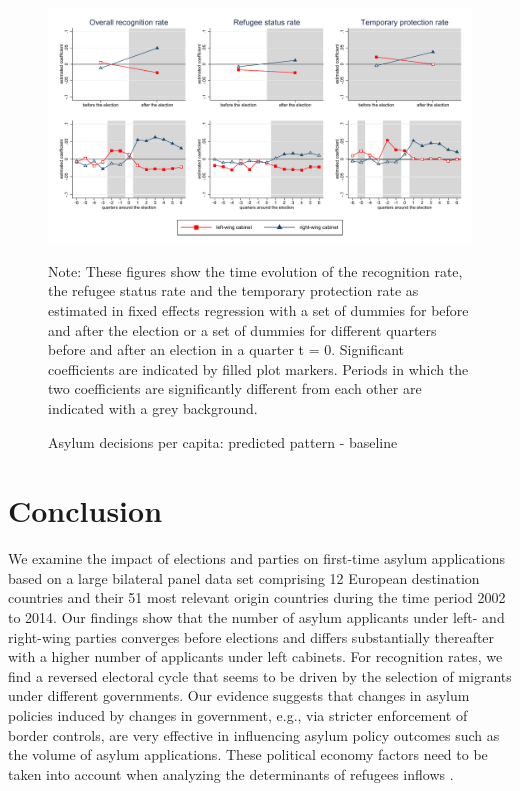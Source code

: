 \documentclass[a4paper,12pt]{article}
\begin{document}
\begin{figure}
	\caption{Asylum decisions per capita: predicted pattern - baseline}
	\centering
	\begin{minipage}{1\textwidth} 
		\includegraphics[width=\linewidth]{../results/decisions/dec_graphs_baseline.pdf}
		{\scriptsize Note: These figures show the time evolution of the recognition rate, the refugee status rate and the temporary protection rate as estimated in fixed effects regression with a set of dummies for before and after the election or a set of dummies for different quarters before and after an election in a quarter t = 0. Significant coefficients are indicated by filled plot markers. Periods in which the two coefficients are significantly different from each other are indicated with a grey background. \par}
	\end{minipage}
\label{dec_graphs_baseline}
\end{figure}



\section{Conclusion}\label{sec:conclusion}

We examine the impact of elections and parties on first-time asylum applications based on a large bilateral panel data set comprising 12 European destination countries and their 51 most relevant origin countries during the time period 2002 to 2014. Our findings show that  the number of asylum applicants under left- and right-wing parties converges before elections and differs substantially thereafter with a higher number of applicants under left cabinets. For recognition rates, we find a reversed electoral cycle that seems to be driven by the selection of migrants under different governments. Our evidence suggests that changes in asylum policies induced by changes in government, e.g., via  stricter enforcement of border controls, are very effective in influencing asylum policy outcomes such as the volume of asylum applications. These political economy factors need to be taken into account when analyzing the determinants of refugees inflows \citep{gorlach2017}. 
\end{document}
